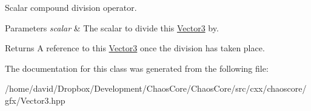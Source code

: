 Scalar compound division operator. 


\begin{DoxyParams}{Parameters}
{\em scalar} & The scalar to divide this \hyperlink{classchaos_1_1gfx_1_1_vector3}{Vector3} by. \\
\hline
\end{DoxyParams}
\begin{DoxyReturn}{Returns}
A reference to this \hyperlink{classchaos_1_1gfx_1_1_vector3}{Vector3} once the division has taken place. 
\end{DoxyReturn}


The documentation for this class was generated from the following file\-:\begin{DoxyCompactItemize}
\item 
/home/david/\-Dropbox/\-Development/\-Chaos\-Core/\-Chaos\-Core/src/cxx/chaoscore/gfx/Vector3.\-hpp\end{DoxyCompactItemize}
